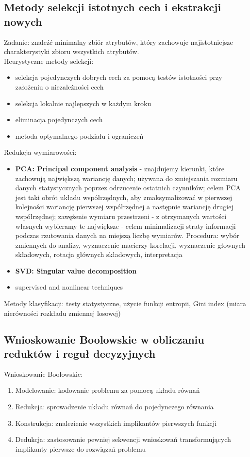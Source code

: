 \documentclass[10pt,a4paper]{article}
\begin{document}
\subsection{Metody selekcji istotnych cech i ekstrakcji nowych}
Zadanie: znaleźć minimalny zbiór atrybutów, który zachowuje najistotniejsze charakterystyki zbioru wszystkich atrybutów. \\
Heurystyczne metody selekcji:
  \begin{itemize}
    \item selekcja pojedynczych dobrych cech za pomocą testów istotności przy założeniu o niezależności cech
    \item selekcja lokalnie najlepszych w każdym kroku
    \item eliminacja pojedynczych cech
    \item metoda optymalnego podziału i ograniczeń
  \end{itemize}
Redukcja wymiarowości:
  \begin{itemize}
    \item \textbf{PCA: Principal component analysis} - znajdujemy kierunki, które zachowują największą wariancję danych; używana do zmiejszania rozmiaru danych statystycznych poprzez odrzucenie ostatnich czynników; celem PCA jest taki obrót układu współrzędnych, aby zmaksymalizować w pierwszej kolejności wariancję pierwszej współrzędnej a następnie wariancję drugiej współrzędnej; zawężenie wymiaru przestrzeni - z otrzymanych wartości własnych wybieramy te największe - celem minimalizacji straty informacji podczas rzutowania danych na miejszą liczbę wymiarów. Procedura: wybór zmiennych do analizy, wyznaczenie macierzy korelacji, wyznaczenie głownych składowych, rotacja głównych składowych, interpretacja
    \item \textbf{SVD: Singular value decomposition}
    \item supervised and nonlinear techniques
  \end{itemize}
  Metody klasyfikacji: testy statystyczne, użycie funkcji entropii, Gini index (miara nierówności rozkładu zmiennej losowej)
\subsection{Wnioskowanie Boolowskie w obliczaniu reduktów i reguł decyzyjnych}
Wnioskowanie Boolowskie:
  \begin{enumerate}
    \item Modelowanie: kodowanie problemu za pomocą układu równań
    \item Redukcja: sprowadzenie układu równań do pojedynczego równania
    \item Konstrukcja: znalezienie wszystkich implikantów pierwszych funkcji
    \item Dedukcja: zastosowanie pewniej sekwencji wnioskowań transformujących implikanty pierwsze do rozwiązań problemu
  \end{enumerate}
\end{document}
